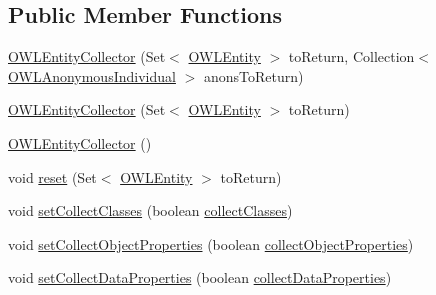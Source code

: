 \subsection*{Public Member Functions}
\begin{DoxyCompactItemize}
\item 
\hyperlink{classorg_1_1semanticweb_1_1owlapi_1_1util_1_1_o_w_l_entity_collector_aa516bb2599eac41dda070be1841f7f4e}{O\-W\-L\-Entity\-Collector} (Set$<$ \hyperlink{interfaceorg_1_1semanticweb_1_1owlapi_1_1model_1_1_o_w_l_entity}{O\-W\-L\-Entity} $>$ to\-Return, Collection$<$ \hyperlink{interfaceorg_1_1semanticweb_1_1owlapi_1_1model_1_1_o_w_l_anonymous_individual}{O\-W\-L\-Anonymous\-Individual} $>$ anons\-To\-Return)
\item 
\hyperlink{classorg_1_1semanticweb_1_1owlapi_1_1util_1_1_o_w_l_entity_collector_a896f167ee32162e153800b9582fc1e92}{O\-W\-L\-Entity\-Collector} (Set$<$ \hyperlink{interfaceorg_1_1semanticweb_1_1owlapi_1_1model_1_1_o_w_l_entity}{O\-W\-L\-Entity} $>$ to\-Return)
\item 
\hyperlink{classorg_1_1semanticweb_1_1owlapi_1_1util_1_1_o_w_l_entity_collector_ae7edefc8a8a0d38976b0fdd54c25a7ca}{O\-W\-L\-Entity\-Collector} ()
\item 
void \hyperlink{classorg_1_1semanticweb_1_1owlapi_1_1util_1_1_o_w_l_entity_collector_a92da9444c5a39bb84162a00eb71ccb2b}{reset} (Set$<$ \hyperlink{interfaceorg_1_1semanticweb_1_1owlapi_1_1model_1_1_o_w_l_entity}{O\-W\-L\-Entity} $>$ to\-Return)
\item 
void \hyperlink{classorg_1_1semanticweb_1_1owlapi_1_1util_1_1_o_w_l_entity_collector_a4f983345a897ecea802b71439d161da2}{set\-Collect\-Classes} (boolean \hyperlink{classorg_1_1semanticweb_1_1owlapi_1_1util_1_1_o_w_l_entity_collector_a056751a74d0026a193c89811dfdf839e}{collect\-Classes})
\item 
void \hyperlink{classorg_1_1semanticweb_1_1owlapi_1_1util_1_1_o_w_l_entity_collector_a711c65aeef89c288ba2bbe909761a535}{set\-Collect\-Object\-Properties} (boolean \hyperlink{classorg_1_1semanticweb_1_1owlapi_1_1util_1_1_o_w_l_entity_collector_aea2013525169eee594310ca8c8c54bfe}{collect\-Object\-Properties})
\item 
void \hyperlink{classorg_1_1semanticweb_1_1owlapi_1_1util_1_1_o_w_l_entity_collector_ae8633e03cf9a81350819da4bd297b977}{set\-Collect\-Data\-Properties} (boolean \hyperlink{classorg_1_1semanticweb_1_1owlapi_1_1util_1_1_o_w_l_entity_collector_a3168775eb686ad3b230f66e8831a67c8}{collect\-Data\-Properties})
\item 

\end{DoxyCompactItemize}
